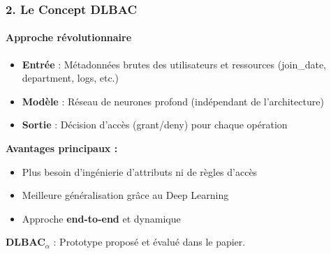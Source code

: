 \documentclass{beamer}
\begin{document}
\begin{frame}
\frametitle{2. Le Concept DLBAC}
\framesubtitle{Approche révolutionnaire}

\begin{itemize}
    \item \textbf{Entrée} : Métadonnées brutes des utilisateurs et ressources (join\_date, department, logs, etc.)
    \item \textbf{Modèle} : Réseau de neurones profond (indépendant de l'architecture)
    \item \textbf{Sortie} : Décision d'accès (grant/deny) pour chaque opération
\end{itemize}


\textbf{Avantages principaux :}
\begin{itemize}
    \item Plus besoin d'ingénierie d'attributs ni de règles d'accès
    \item Meilleure généralisation grâce au Deep Learning
    \item Approche \textbf{end-to-end} et dynamique
\end{itemize}

\textbf{DLBAC$_\alpha$} : Prototype proposé et évalué dans le papier.

\end{frame}
\end{document}
